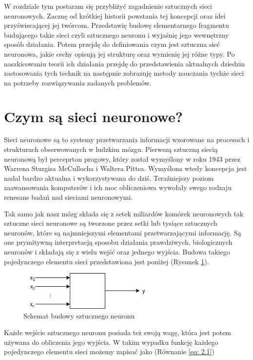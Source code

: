 \documentclass[12pt, oneside, a4paper]{report}
\begin{document}
W rozdziale tym postaram się przybliżyć zagadnienie sztucznych sieci neuronowych. Zacznę od krótkiej historii powstania tej koncepcji oraz idei przyświecającej jej twórcom. Przedstawię budowę elementarnego fragmentu budującego takie sieci czyli sztucznego neuronu i wyjaśnię jego wewnętrzny sposób działania. Potem przejdę do definiowania czym jest sztuczna sieć neuronowa, jakie cechy opisują jej strukturę oraz wymienię jej różne typy. Po naszkicowaniu teorii ich działania przejdę do przedstawienia aktualnych dziedzin zastosowania tych technik na następnie zobrazuję metody nauczania tychże sieci na potrzeby rozwiązywania zadanych problemów.

\section{Czym są sieci neuronowe?}

Sieci neuronowe są to systemy przetwarzania informacji wzorowane na procesach i strukturach obserwowanych w ludzkim mózgu. Pierwszą sztuczną siecią neuronową był perceprton progowy, który został wymyślony w roku 1943 przez Warrena Sturgisa McCullocha i Waltera Pittsa. Wymyślona wtedy koncepcja jest nadal bardzo aktualna i wykorzystywana do dziś. Teraźniejszy poziom zaawansowania komputerów i ich moc obliczeniowa wywołały swego rodzaju renesans badań nad sieciami neuronowymi.

Tak samo jak nasz mózg składa się z setek miliardów komórek neuronowych tak sztuczne sieci neuronowe są tworzone przez setki lub tysiące sztucznych neuronów, które są najmniejszymi elementami przetwarzającymi informację. Są one prymitywną interpretacją sposobu działania prawdziwych, biologicznych neuronów i składają się z wielu wejść oraz jednego wyjścia. Budowa takiego pojedynczego elementu sieci przedstawiona jest poniżej (Rysunek \ref{fig: 2.1}).

\begin{figure}[h]
	\centering
	\includegraphics[width=7cm]{fig211.png}
	\caption{Schemat budowy sztucznego neuronu}
	\label{fig: 2.1}
\end{figure}

Każde wejście sztucznego neuronu posiada też swoją wagę, która jest potem używana do obliczenia jego wyjścia. W takim wypadku funkcję każdego pojedynczego elementu sieci możemy zapisać jako (Równanie \ref{eq: 2.1})
\end{document}
